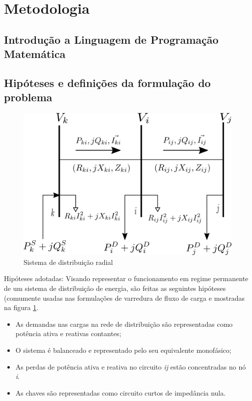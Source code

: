 \section{Metodologia}

\subsection{Introdução a Linguagem de Programação Matemática}

\subsection{Hipóteses e definições da formulação do problema}

\begin{figure}[H]
    \centering
    \includegraphics[scale = 1.2]{01_img/diagrama_nos.png}
    \caption{Sistema de distribuição radial}
    \label{fig:SDR}

\end{figure}

Hipóteses adotadas:
Visando representar o funcionamento em regime permanente de um sistema de distribuição de energia, são feitas as seguintes hipóteses (comumente usadas nas formulações de varredura de fluxo de carga \cite{ShirmohammadiANetworks} e mostradas na figura \ref{fig:SDR}.

\begin{itemize}
    \item As demandas nas cargas na rede de distribuição são representadas como potência ativa e reativas contantes;
    
    \item O sistema é balanceado e representado pelo seu equivalente monofásico;
    
    \item As perdas de potência ativa e reativa no circuito \textit{ij} estão concentradas no nó \textit{i}.
    
    \item As chaves são representadas como circuito curtos de impedância nula.
\end{itemize}